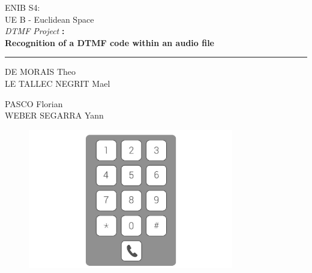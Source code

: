 \documentclass[a4paper, twoside]{article} %
\begin{document}
\begin{titlepage}
\begin{center}
ENIB S4: \\
UE B - Euclidean Space\\
\vspace{2cm}
\huge{\textsl{DTMF Project}\textbf{ : \\
Recognition of a DTMF code within an audio file}}\\
\end{center}
\begin{center}
\rule{\linewidth}{1pt}
\end{center}
\begin{minipage}[t]{0.47\textwidth}
	{\large DE MORAIS Theo}\\
	{\large LE TALLEC NEGRIT Mael}
\end{minipage}\hfill
\begin{minipage}[t]{0.47\textwidth}\raggedleft
	{\large PASCO Florian}\\
	{\large WEBER SEGARRA Yann}
\end{minipage}
\vspace{2.5cm}
\begin{figure}[H]
	\centering \includegraphics[width=0.8\textwidth]{guardpage.jpg}
\end{figure}
\vspace{0.3cm}
\end{titlepage}

\tableofcontents
\listoffigures

\newpage

\newpage
\newpage
\end{document}
